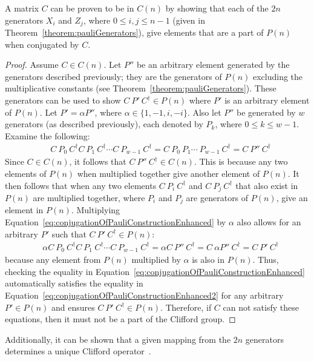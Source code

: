\begin{theorem}
\label{theorem:proofForProvingGateIsClifford}
A matrix $C$ can be proven to be in $C(n)$ by showing that each of the $2n$ generators $X_i$ and $Z_j$, where $0 \leq i, j \leq n-1$ (given in Theorem~\ref{theorem:pauliGenerators}), give elements that are a part of $P(n)$ when conjugated by $C$. 
\end{theorem}
\begin{proof}
Assume $C \in C(n)$. Let $P''$ be an arbitrary element generated by the generators described previously; they are the generators of $P(n)$ excluding the multiplicative constants (see Theorem~\ref{theorem:pauliGenerators}). These generators can be used to show $C \ P' \ C^{\dagger} \in P(n)$ where $P'$ is an arbitrary element of $P(n)$. Let $P' = \alpha P''$, where $\alpha \in \{1, -1, i, -i\}$. Also let $P''$ be generated by $w$ generators (as described previously), each denoted by $P_k$, where $0 \leq k \leq w - 1$. Examine the following:
\begin{align}
\label{eq:conjugationOfPauliConstructionEnhanced}
&C \ P_0 \ C^{\dagger}C \ P_1 \ C^{\dagger}\cdots C \ P_{w-1} \ C^{\dagger} = C \ P_0 \ P_1 \cdots \ P_{w-1} \ C^{\dagger} = C \ P'' \ C^{\dagger}
\end{align}
Since $C \in C(n)$, it follows that $C \ P'' \ C^{\dagger} \in C(n)$. This is because any two elements of $P(n)$ when multiplied together give another element of $P(n)$. It then follows that when any two elements $C \ P_i \ C^{\dagger}$ and $C \ P_j \ C^{\dagger}$ that also exist in $P(n)$ are multiplied together, where $P_i$ and $P_j$ are generators of $P(n)$, give an element in $P(n)$. Multiplying Equation~\eqref{eq:conjugationOfPauliConstructionEnhanced} by $\alpha$ also allows for an arbitrary $P'$ such that $C \ P' \ C^{\dagger} \in P(n)$:
\begin{align}
\label{eq:conjugationOfPauliConstructionEnhanced2}
&\alpha C \ P_0 \ C^{\dagger}C \ P_1 \ C^{\dagger}\cdots C \ P_{w-1} \ C^{\dagger} = \alpha C \ P'' \ C^{\dagger} = C \ \alpha P'' \ C^{\dagger} = C \ P' \ C^{\dagger}
\end{align}
because any element from $P(n)$ multiplied by $\alpha$ is also in $P(n)$. Thus, checking the equality in Equation~\eqref{eq:conjugationOfPauliConstructionEnhanced} automatically satisfies the equality in Equation~\eqref{eq:conjugationOfPauliConstructionEnhanced2} for any arbitrary $P' \in P(n)$ and ensures $C \ P' \ C^{\dagger} \in P(n)$. Therefore, if $C$ can not satisfy these equations, then it must not be a part of the Clifford group.
\end{proof}
Additionally, it can be shown that a given mapping from the $2n$ generators determines a unique Clifford operator~\cite{ozols2008clifford}.

